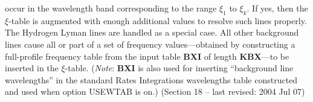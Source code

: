 occur in the wavelength band corresponding to the range $\xi_1$ to $\xi_k$.
If yes, then the $\xi$-table is augmented with enough additional values to resolve
such lines properly. The Hydrogen Lyman lines are handled as a special
case. All other background lines cause all or part of a set of frequency
values---obtained by constructing a full-profile frequency table from
the input table {\bf BXI} of length {\bf KBX}---to be inserted in the
$\xi$-table.
({\it Note}: {\bf BXI} is also used for inserting ``background
line wavelengths'' in the standard Rates Integrations wavelengths table
constructed and used when option USEWTAB is on.)
\vfill
\noindent (Section 18 -- last revised: 2004 Jul 07) %
{}
\ej
